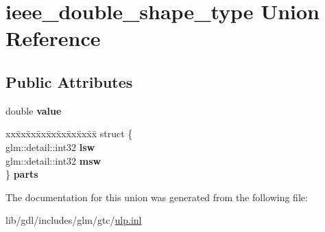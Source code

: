 \hypertarget{unionieee__double__shape__type}{}\section{ieee\+\_\+double\+\_\+shape\+\_\+type Union Reference}
\label{unionieee__double__shape__type}
\subsection*{Public Attributes}
\begin{DoxyCompactItemize}
\item 
\hypertarget{unionieee__double__shape__type_a2d9c4cab9e3fa74e4be6d72f798a145b}{}double {\bfseries value}\label{unionieee__double__shape__type_a2d9c4cab9e3fa74e4be6d72f798a145b}

\item 
\hypertarget{unionieee__double__shape__type_a32b14abecd01d397f857a7644a2ab1a6}{}\begin{tabbing}
xx\=xx\=xx\=xx\=xx\=xx\=xx\=xx\=xx\=\kill
struct \{\\
\>glm::detail::int32 {\bfseries lsw}\\
\>glm::detail::int32 {\bfseries msw}\\
\} {\bfseries parts}\label{unionieee__double__shape__type_a32b14abecd01d397f857a7644a2ab1a6}
\\

\end{tabbing}\end{DoxyCompactItemize}


The documentation for this union was generated from the following file\+:\begin{DoxyCompactItemize}
\item 
lib/gdl/includes/glm/gtc/\hyperlink{ulp_8inl}{ulp.\+inl}\end{DoxyCompactItemize}
